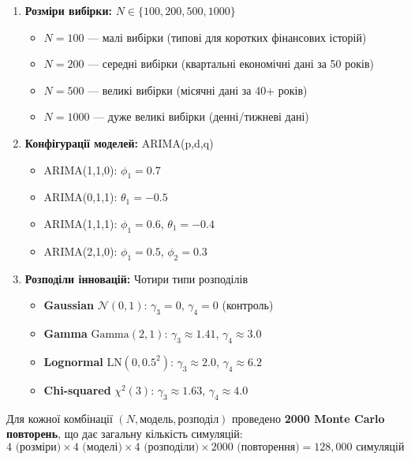 \documentclass[12pt,a4paper]{article}
\newcommand{\Gammadist}{\text{Gamma}}
\begin{document}
\begin{enumerate}
    \item \textbf{Розміри вибірки:} $N \in \{100, 200, 500, 1000\}$
    \begin{itemize}
        \item $N = 100$ --- малі вибірки (типові для коротких фінансових історій)
        \item $N = 200$ --- середні вибірки (квартальні економічні дані за 50 років)
        \item $N = 500$ --- великі вибірки (місячні дані за 40+ років)
        \item $N = 1000$ --- дуже великі вибірки (денні/тижневі дані)
    \end{itemize}

    \item \textbf{Конфігурації моделей:} ARIMA(p,d,q)
    \begin{itemize}
        \item ARIMA(1,1,0): $\phi_1 = 0.7$
        \item ARIMA(0,1,1): $\theta_1 = -0.5$
        \item ARIMA(1,1,1): $\phi_1 = 0.6$, $\theta_1 = -0.4$
        \item ARIMA(2,1,0): $\phi_1 = 0.5$, $\phi_2 = 0.3$
    \end{itemize}

    \item \textbf{Розподіли інновацій:} Чотири типи розподілів
    \begin{itemize}
        \item \textbf{Gaussian} $\mathcal{N}(0,1)$: $\gamma_3 = 0$, $\gamma_4 = 0$ (контроль)
        \item \textbf{Gamma} $\Gammadist(2,1)$: $\gamma_3 \approx 1.41$, $\gamma_4 \approx 3.0$
        \item \textbf{Lognormal} $\text{LN}(0, 0.5^2)$: $\gamma_3 \approx 2.0$, $\gamma_4 \approx 6.2$
        \item \textbf{Chi-squared} $\chi^2(3)$: $\gamma_3 \approx 1.63$, $\gamma_4 \approx 4.0$
    \end{itemize}
\end{enumerate}

Для кожної комбінації $(N, \text{модель}, \text{розподіл})$ проведено \textbf{2000 Monte Carlo повторень}, що дає загальну кількість симуляцій:
\begin{equation}
\label{eq:total_simulations}
4 \text{ (розміри)} \times 4 \text{ (моделі)} \times 4 \text{ (розподіли)} \times 2000 \text{ (повторення)} = 128{,}000 \text{ симуляцій}
\end{equation}
\end{document}
